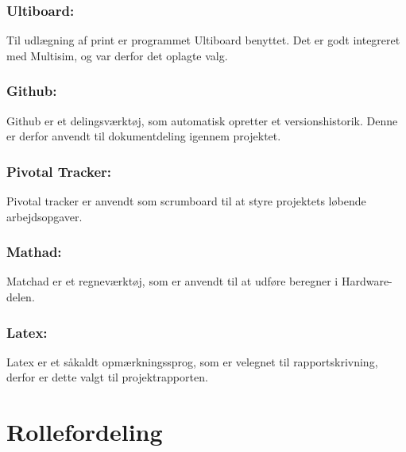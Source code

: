 \subsubsection{Ultiboard:}
Til udlægning af print er programmet Ultiboard benyttet. Det er godt integreret med Multisim, og var derfor det oplagte valg.
\subsubsection{Github:}
Github er et delingsværktøj, som automatisk opretter et versionshistorik. Denne er derfor anvendt til dokumentdeling igennem projektet. 
\subsubsection{Pivotal Tracker:}
Pivotal tracker er anvendt som scrumboard til at styre projektets løbende arbejdsopgaver. 
\subsubsection{Mathad:}
Matchad er et regneværktøj, som er anvendt til at udføre beregner i Hardware-delen. 
\subsubsection{Latex:}
Latex er et såkaldt opmærkningssprog, som er velegnet til rapportskrivning, derfor er dette valgt til projektrapporten. 

\section{Rollefordeling}
